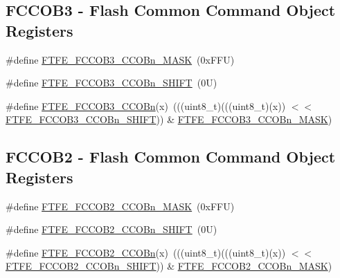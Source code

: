 \subsection*{F\+C\+C\+O\+B3 -\/ Flash Common Command Object Registers}
\begin{DoxyCompactItemize}
\item 
\#define \mbox{\hyperlink{group___f_t_f_e___register___masks_ga10bc3ec6bba0545905e9cc4c41264b67}{F\+T\+F\+E\+\_\+\+F\+C\+C\+O\+B3\+\_\+\+C\+C\+O\+Bn\+\_\+\+M\+A\+SK}}~(0x\+F\+F\+U)
\item 
\#define \mbox{\hyperlink{group___f_t_f_e___register___masks_gad4804cedc12c2c61544737b797081590}{F\+T\+F\+E\+\_\+\+F\+C\+C\+O\+B3\+\_\+\+C\+C\+O\+Bn\+\_\+\+S\+H\+I\+FT}}~(0\+U)
\item 
\#define \mbox{\hyperlink{group___f_t_f_e___register___masks_ga0f3bd12c016c6f252723a12ae330ed91}{F\+T\+F\+E\+\_\+\+F\+C\+C\+O\+B3\+\_\+\+C\+C\+O\+Bn}}(x)~(((uint8\+\_\+t)(((uint8\+\_\+t)(x)) $<$$<$ \mbox{\hyperlink{group___f_t_f_e___register___masks_gad4804cedc12c2c61544737b797081590}{F\+T\+F\+E\+\_\+\+F\+C\+C\+O\+B3\+\_\+\+C\+C\+O\+Bn\+\_\+\+S\+H\+I\+FT}})) \& \mbox{\hyperlink{group___f_t_f_e___register___masks_ga10bc3ec6bba0545905e9cc4c41264b67}{F\+T\+F\+E\+\_\+\+F\+C\+C\+O\+B3\+\_\+\+C\+C\+O\+Bn\+\_\+\+M\+A\+SK}})
\end{DoxyCompactItemize}
\subsection*{F\+C\+C\+O\+B2 -\/ Flash Common Command Object Registers}
\begin{DoxyCompactItemize}
\item 
\#define \mbox{\hyperlink{group___f_t_f_e___register___masks_ga87254fe5b3a8f4a9c0251e3fac167128}{F\+T\+F\+E\+\_\+\+F\+C\+C\+O\+B2\+\_\+\+C\+C\+O\+Bn\+\_\+\+M\+A\+SK}}~(0x\+F\+F\+U)
\item 
\#define \mbox{\hyperlink{group___f_t_f_e___register___masks_ga773bf70a49a9212d4fcbf025e64955d8}{F\+T\+F\+E\+\_\+\+F\+C\+C\+O\+B2\+\_\+\+C\+C\+O\+Bn\+\_\+\+S\+H\+I\+FT}}~(0\+U)
\item 
\#define \mbox{\hyperlink{group___f_t_f_e___register___masks_ga4ace84bb4dfe61a301135516ca61de6b}{F\+T\+F\+E\+\_\+\+F\+C\+C\+O\+B2\+\_\+\+C\+C\+O\+Bn}}(x)~(((uint8\+\_\+t)(((uint8\+\_\+t)(x)) $<$$<$ \mbox{\hyperlink{group___f_t_f_e___register___masks_ga773bf70a49a9212d4fcbf025e64955d8}{F\+T\+F\+E\+\_\+\+F\+C\+C\+O\+B2\+\_\+\+C\+C\+O\+Bn\+\_\+\+S\+H\+I\+FT}})) \& \mbox{\hyperlink{group___f_t_f_e___register___masks_ga87254fe5b3a8f4a9c0251e3fac167128}{F\+T\+F\+E\+\_\+\+F\+C\+C\+O\+B2\+\_\+\+C\+C\+O\+Bn\+\_\+\+M\+A\+SK}})
\end{DoxyCompactItemize}
